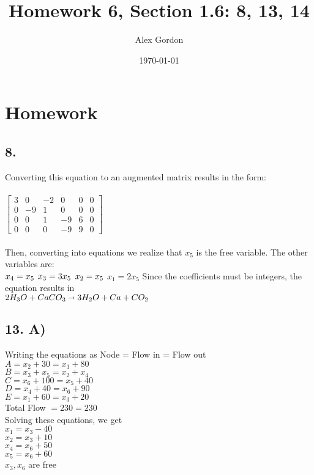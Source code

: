 \documentclass[12]{scrartcl}
\begin{document}
\title{Homework 6, Section 1.6: 8, 13, 14}
\author{Alex Gordon}
\date{\today}
\maketitle
\section*{Homework}
\subsection*{8.}
Converting this equation to an augmented matrix results in the form:\\
\\
$\begin{bmatrix} 3&0&-2&0&0&0 \\ 0&-9&1&0&0&0 \\ 0&0&1&-9&6&0 \\ 0&0&0&-9&9&0  \end{bmatrix}$\\
\\
Then, converting into equations we realize that $x_5$ is the free variable. The other variables are: \\
$x_4 = x_5\\$
$x_3 = 3x_5\\$
$x_2 = x_5\\$
$x_1 = 2x_5$
Since the coefficients must be integers, the equation results in \\
$2H_3O + CaCO_3 \shortrightarrow 3H_2O + Ca + CO_2$
\subsection*{13. A)}
Writing the equations as Node = Flow in = Flow out \\
$A = x_2 + 30 = x_1 + 80 $\\
$B = x_3 + x_5 = x_2 + x_4 $\\
$C = x_6 + 100= x_5 + 40 $\\
$D = x_4 + 40 = x_6 + 90 $\\
$E = x_1 + 60= x_3 +20$\\
Total Flow $ = 230 = 230 $\\ 
Solving these equations, we get \\
$x_1 = x_3 - 40$\\
$x_2 = x_3 + 10$\\
$x_4 = x_6 +50$\\
$x_5 = x_6 + 60$\\
$x_3, x_6$ are free\\
\end{document}
